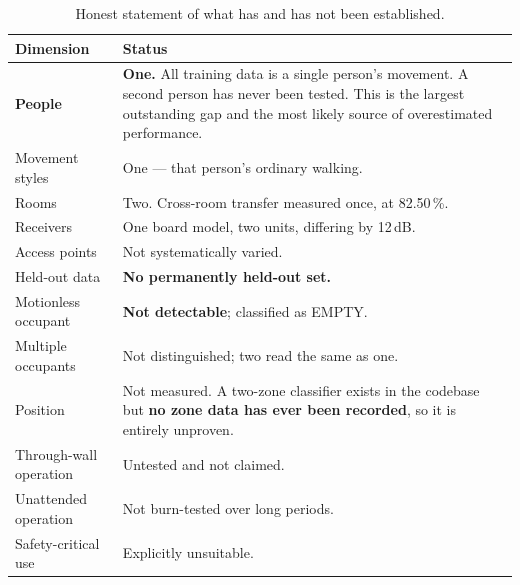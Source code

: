 \documentclass[11pt,a4paper,oneside]{report}
\begin{document}
\begin{table}[H]
\centering
\caption{Honest statement of what has and has not been established.}
\label{tab:limits}
\begin{tabularx}{\linewidth}{@{}lX@{}}
\toprule
\textbf{Dimension} & \textbf{Status} \\
\midrule
\textbf{People} & \textbf{One.} All training data is a single person's
movement. A second person has never been tested. This is the largest
outstanding gap and the most likely source of overestimated performance. \\
Movement styles & One --- that person's ordinary walking. \\
Rooms & Two. Cross-room transfer measured once, at 82.50\,\%. \\
Receivers & One board model, two units, differing by 12\,dB. \\
Access points & Not systematically varied. \\
Held-out data & \textbf{No permanently held-out set.} \\
Motionless occupant & \textbf{Not detectable}; classified as EMPTY. \\
Multiple occupants & Not distinguished; two read the same as one. \\
Position & Not measured. A two-zone classifier exists in the codebase but
\textbf{no zone data has ever been recorded}, so it is entirely unproven. \\
Through-wall operation & Untested and not claimed. \\
Unattended operation & Not burn-tested over long periods. \\
Safety-critical use & Explicitly unsuitable. \\
\bottomrule
\end{tabularx}
\end{table}
\end{document}
